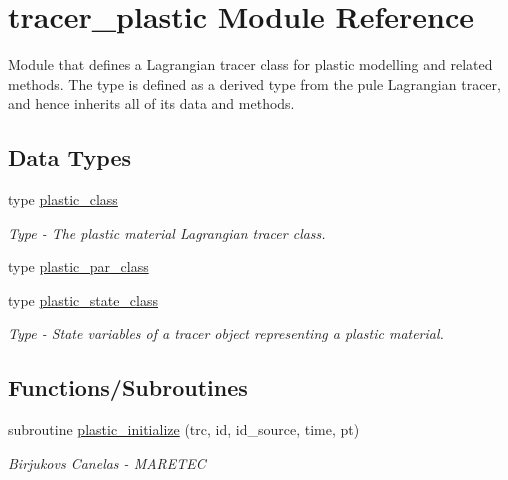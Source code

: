 \hypertarget{namespacetracer__plastic}{}\section{tracer\+\_\+plastic Module Reference}
\label{namespacetracer__plastic}


Module that defines a Lagrangian tracer class for plastic modelling and related methods. The type is defined as a derived type from the pule Lagrangian tracer, and hence inherits all of it\textquotesingle{}s data and methods.  


\subsection*{Data Types}
\begin{DoxyCompactItemize}
\item 
type \mbox{\hyperlink{structtracer__plastic_1_1plastic__class}{plastic\+\_\+class}}
\begin{DoxyCompactList}\small\item\em Type -\/ The plastic material Lagrangian tracer class. \end{DoxyCompactList}\item 
type \mbox{\hyperlink{structtracer__plastic_1_1plastic__par__class}{plastic\+\_\+par\+\_\+class}}
\item 
type \mbox{\hyperlink{structtracer__plastic_1_1plastic__state__class}{plastic\+\_\+state\+\_\+class}}
\begin{DoxyCompactList}\small\item\em Type -\/ State variables of a tracer object representing a plastic material. \end{DoxyCompactList}\end{DoxyCompactItemize}
\subsection*{Functions/\+Subroutines}
\begin{DoxyCompactItemize}
\item 
subroutine \mbox{\hyperlink{namespacetracer__plastic_a9a4e16b71bcd88b95c80ddb9c3ddb7d1}{plastic\+\_\+initialize}} (trc, id, id\+\_\+source, time, pt)
\begin{DoxyCompactList}\small\item\em Birjukovs Canelas -\/ M\+A\+R\+E\+T\+EC \end{DoxyCompactList}\end{DoxyCompactItemize}


